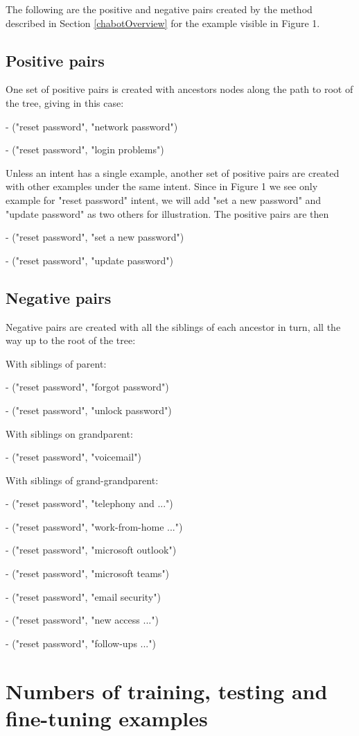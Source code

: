 \documentclass[sigconf, anonymous=true]{acmart}
\begin{document}
The following are the positive and negative pairs created by the method described in Section \ref{chabotOverview} for the example visible in Figure 1.

\subsection{Positive pairs}
One set of positive pairs is created with ancestors nodes along the path to root of the tree, giving in this case:

- ("reset password", "network password")

- ("reset password", "login problems")

Unless an intent has a single example, another set of positive pairs are created with other examples under the same intent. Since in Figure 1 we see only example for "reset password" intent, we will add "set a new password" and "update password" as two others for illustration. The positive pairs are then

- ("reset password", "set a new password")

- ("reset password", "update password")


\subsection{Negative pairs}
Negative pairs are created with all the siblings of each ancestor in turn, all the way up to the root of the tree:

With siblings of parent:

- ("reset password", "forgot password")

- ("reset password", "unlock password")

With siblings on grandparent:

- ("reset password", "voicemail")

With siblings of grand-grandparent:

- ("reset password", "telephony and ...")

- ("reset password", "work-from-home ...")

- ("reset password", "microsoft outlook")

- ("reset password", "microsoft teams")

- ("reset password", "email security")

- ("reset password", "new access ...")

- ("reset password", "follow-ups ...")

\section{Numbers of training, testing and fine-tuning examples}
\label{sec:noExamples}
\end{document}
